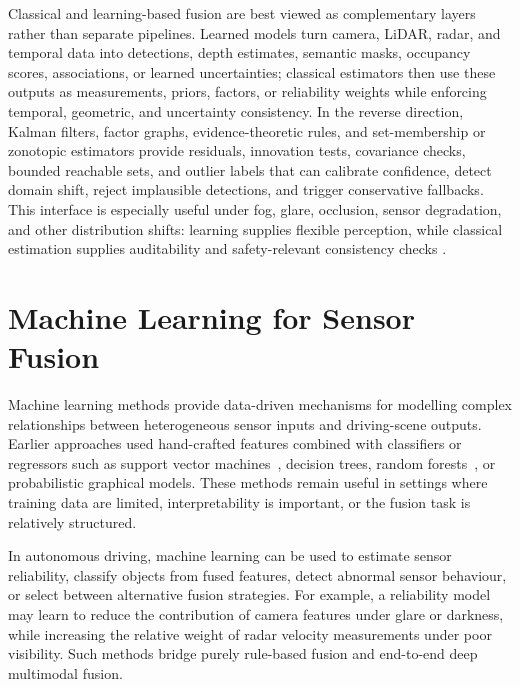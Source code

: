 \documentclass[graybox,envcountchap]{style/SNmono}
\begin{document}
Classical and learning-based fusion are best viewed as complementary layers rather than separate pipelines. Learned models turn camera, LiDAR, radar, and temporal data into detections, depth estimates, semantic masks, occupancy scores, associations, or learned uncertainties; classical estimators then use these outputs as measurements, priors, factors, or reliability weights while enforcing temporal, geometric, and uncertainty consistency. In the reverse direction, Kalman filters, factor graphs, evidence-theoretic rules, and set-membership or zonotopic estimators provide residuals, innovation tests, covariance checks, bounded reachable sets, and outlier labels that can calibrate confidence, detect domain shift, reject implausible detections, and trigger conservative fallbacks. This interface is especially useful under fog, glare, occlusion, sensor degradation, and other distribution shifts: learning supplies flexible perception, while classical estimation supplies auditability and safety-relevant consistency checks \cite{khaleghi_multisensor_2013,baltrusaitis_multimodal_2019,li2022_gp_zkf}.


\section{Machine Learning for Sensor Fusion}

Machine learning methods provide data-driven mechanisms for modelling complex relationships between heterogeneous sensor inputs and driving-scene outputs. Earlier approaches used hand-crafted features combined with classifiers or regressors such as support vector machines~\cite{cortes1995_svm}, decision trees, random forests~\cite{breiman2001_rf}, or probabilistic graphical models. These methods remain useful in settings where training data are limited, interpretability is important, or the fusion task is relatively structured.

In autonomous driving, machine learning can be used to estimate sensor reliability, classify objects from fused features, detect abnormal sensor behaviour, or select between alternative fusion strategies. For example, a reliability model may learn to reduce the contribution of camera features under glare or darkness, while increasing the relative weight of radar velocity measurements under poor visibility. Such methods bridge purely rule-based fusion and end-to-end deep multimodal fusion.
\end{document}

